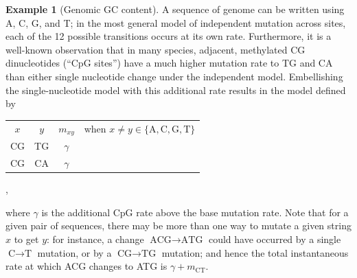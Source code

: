 \documentclass{article}
\newcommand{\nA}{\mbox{A}}  %
\newcommand{\nC}{\mbox{C}}
\newcommand{\nG}{\mbox{G}}
\newcommand{\nT}{\mbox{T}}
\theoremstyle{plain}
\theoremstyle{definition}
\newtheorem{example}{Example}[section]
\begin{document}
\begin{example}[Genomic GC content]
    A sequence of genome can be written using A, C, G, and T;
    in the most general model of independent mutation across sites, each of the 12 possible transitions occurs at its own rate.
    Furthermore, it is a well-known observation that in many species,
    adjacent, methylated CG dinucleotides (``CpG sites'') have a much higher mutation rate to TG and CA
    than either single nucleotide change under the independent model.
    Embellishing the single-nucleotide model with this additional rate results in the model defined by
    \begin{center}
      \begin{tabular}{c@{\quad$\to$\quad}c@{\quad at rate\quad }cc}
        $x$  &  $y$  &  $m_{xy}$ & when $x \neq y \in \{\nA,\nC,\nG,\nT\}$  \\
        \nC\nG   &  \nT\nG   &  $\gamma$ & \\
        \nC\nG   &  \nC\nA   &  $\gamma$ &
      \end{tabular} ,
    \end{center}
    where $\gamma$ is the additional CpG rate above the base mutation rate.
    Note that for a given pair of sequences, there may be more than one way to mutate a given string $x$ to get $y$:
    for instance, a change $\nA\nC\nG \to \nA\nT\nG$ could have occurred by a single $\nC \to \nT$ mutation,
    or by a $\nC\nG \to \nT\nG$ mutation;
    and hence the total instantaneous rate at which ACG changes to ATG is $\gamma + m_{\nC\nT}$.


\end{example}
\end{document}
